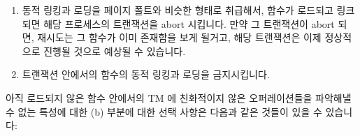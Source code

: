 \begin{enumerate}
\item	동적 링킹과 로딩을 페이지 폴트와 비슷한 형태로 취급해서, 함수가
	로드되고 링크되면 해당 프로세스의 트랜잭션을 abort 시킵니다.
	만약 그 트랜잭션이 abort 되면, 재시도는 그 함수가 이미 존재함을 보게
	될거고, 해당 트랜잭션은 이제 정상적으로 진행될 것으로 예상될 수
	있습니다.
\item	트랜잭션 안에서의 함수의 동적 링킹과 로딩을 금지시킵니다.

\end{enumerate}

아직 로드되지 않은 함수 안에서의 TM 에 친화적이지 않은 오퍼레이션들을 파악해낼
수 없는 특성에 대한 (b) 부분에 대한 선택 사항은 다음과 같은 것들이 있을 수
있습니다:

